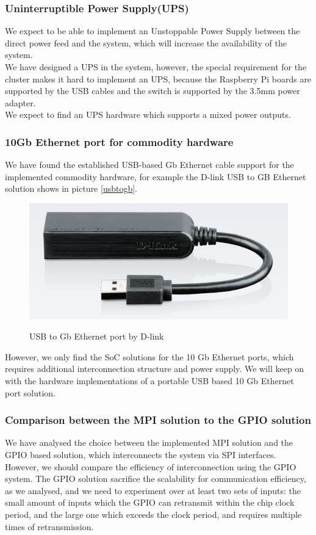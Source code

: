 \documentclass[11pt,openright,a4paper]{report}
\begin{document}
\subsubsection{Uninterruptible Power Supply(UPS)}
We expect to be able to implement an Unstoppable Power Supply between the direct power feed and the system, which will increase the availability of the system.\\
We have designed a UPS in the system, however, the special requirement for the cluster makes it hard to implement an UPS, because the Raspberry Pi boards are supported by the USB cables and the switch is supported by the 3.5mm power adapter.\\
We expect to find an UPS hardware which supports a mixed power outputs.\\
\subsubsection{10Gb Ethernet  port for commodity hardware}
We have found the established USB-based Gb Ethernet cable support for the implemented commodity hardware, for example the D-link USB to GB Ethernet solution shows in picture \ref{usbtogb}.\\
\begin{figure}[H]
	\centering
	\includegraphics[width=0.5\linewidth]{picture/usbtogb.jpg}
	\caption{USB to Gb Ethernet port by D-link}\cite{dlink}
	\label{fig:usbtogb}
\end{figure}
However, we only find the SoC solutions for the 10 Gb Ethernet ports, which requires additional interconnection structure and power supply. We will keep on with the hardware implementations of a portable USB based 10 Gb Ethernet port solution.\\
\subsubsection{Comparison between the MPI solution to the GPIO solution}
We have analysed the choice between the implemented MPI solution and the GPIO based solution, which interconnects the system via SPI interfaces. However, we should compare the efficiency of interconnection using the GPIO system. The GPIO solution sacrifice the scalability for communication efficiency, as we analysed, and we need to experiment over at least two sets of inputs: the small amount of inputs which the GPIO can retransmit within the chip clock period, and the large one which exceeds the clock period, and requires multiple times of retransmission.\\
\end{document}
